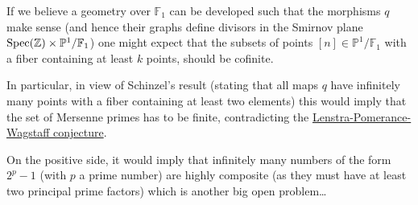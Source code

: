 If we believe a geometry over $\mathbb{F}_1$ can be developed such that the morphisms $q$ make sense (and hence their graphs define divisors in the Smirnov plane $\operatorname{Spec}(\mathbb{Z}) \times \mathbb{P}^1 / \mathbb{F}_1$) one might expect that the subsets of points $[n] \in \mathbb{P}^1 / \mathbb{F}_1$ with a fiber containing at least $k$ points, should be cofinite.

In particular, in view of Schinzel's result (stating that all maps $q$ have infinitely many points with a fiber containing at least two elements) this would imply that the set of Mersenne primes has to be finite, contradicting the \href{http://en.wikipedia.org/wiki/Lenstra-Pomerance-Wagstaff_conjecture}{Lenstra-Pomerance-Wagstaff conjecture}.

On the positive side, it would imply that infinitely many numbers of the form $2^p-1$ (with $p$ a prime number) are highly composite (as they must have at least two principal prime factors) which is another big open problem\ldots
